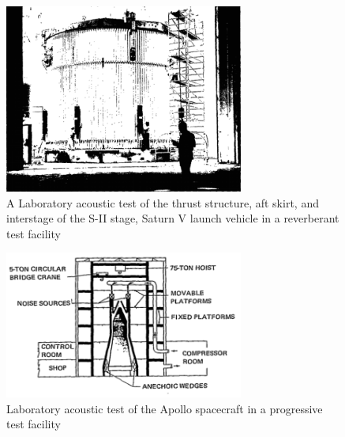\documentclass[]{aiaa-tc}%
\begin{document}
\begin{figure}[htb]
\begin{center}
\includegraphics[width=0.7\textwidth]{Images/Himelblau_Fig37.png}
\caption{A Laboratory acoustic test of the thrust structure, aft skirt, and interstage of the S-II stage, Saturn V launch vehicle in a reverberant test facility \cite{SpaceVehicleAeroacousticVibrationPrediction}}
\label{ReverberantTest}
\end{center}
\end{figure}


\begin{figure}[htb]
\begin{center}
\includegraphics[width=0.7\textwidth]{Images/Himelblau_Fig38.png}
\caption{Laboratory acoustic test of the Apollo spacecraft in a progressive test facility \cite{SpaceVehicleAeroacousticVibrationPrediction}}
\label{ProgressiveTest}
\end{center}
\end{figure}
\end{document}
